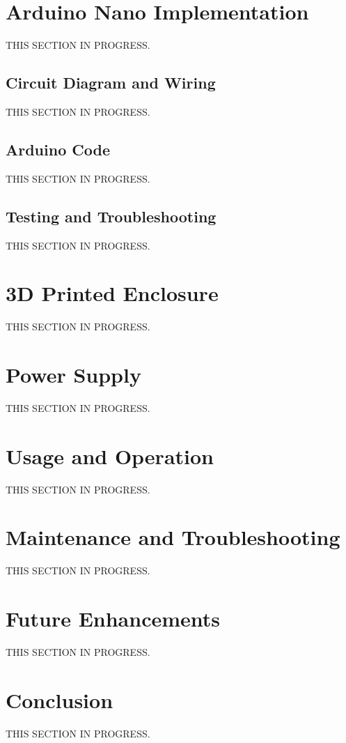 \documentclass{article}
\begin{document}
\begin{multicols}{2}
		\section{Arduino Nano Implementation}
		THIS SECTION IN PROGRESS.
		
			\subsection{Circuit Diagram and Wiring}
			THIS SECTION IN PROGRESS.
			
			\subsection{Arduino Code}
			THIS SECTION IN PROGRESS.
			
			\subsection{Testing and Troubleshooting}
			THIS SECTION IN PROGRESS.
		
		\section{3D Printed Enclosure}
		THIS SECTION IN PROGRESS.
		
		\section{Power Supply}
		THIS SECTION IN PROGRESS.
		
		\section{Usage and Operation}
		THIS SECTION IN PROGRESS.
		
		\section{Maintenance and Troubleshooting}
		THIS SECTION IN PROGRESS.
		
		\section{Future Enhancements}
		THIS SECTION IN PROGRESS.
		
		\section{Conclusion}
		THIS SECTION IN PROGRESS.
		

\end{multicols}
\end{document}
